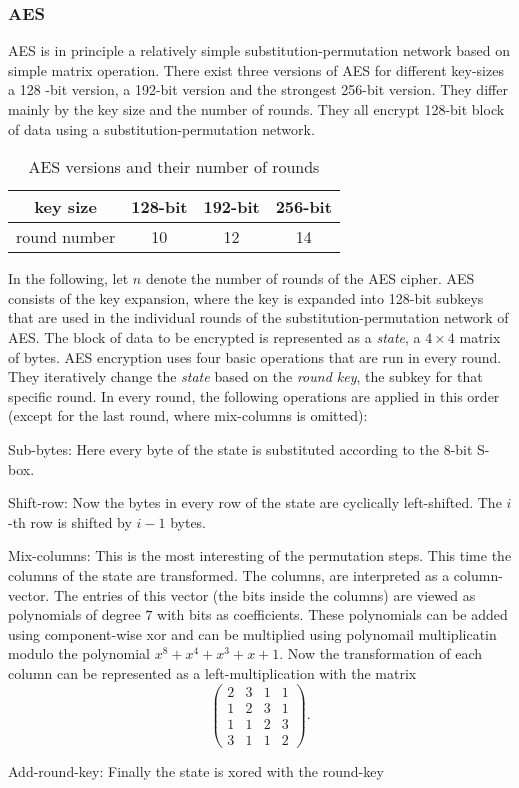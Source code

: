 \subsubsection{AES} %
AES is in principle a relatively simple substitution-permutation network based on simple matrix operation. There exist three versions of AES for different key-sizes a 128 -bit version, a 192-bit version and the strongest 256-bit version. They differ mainly by the key size and the number of rounds. They all encrypt 128-bit block of data using a substitution-permutation network.\par
\begin{table}[ht]\centering
  \begin{tabular}{|c|c|c|c|}
  	\hline key size & 128-bit & 192-bit & 256-bit \\ 
  	\hline round number & 10 & 12 & 14 \\ 
  	\hline 
  \end{tabular}
  \caption{AES versions and their number of rounds}
\end{table} 
In the following, let $n$ denote the number of rounds of the AES cipher. 
AES consists of the key expansion, where the key is expanded into 128-bit subkeys that are used in the individual rounds of the substitution-permutation network of AES. The block of data to be encrypted is represented as a \emph{state}, a $4\times 4$ matrix of bytes.  
AES encryption uses four basic operations that are run in every round. They iteratively change the \emph{state} based on the \emph{round key}, the subkey for that specific round. In every round, the following operations are applied in this order (except for the last round, where mix-columns is omitted):
\begin{compactenum}
  \item Sub-bytes: Here every byte of the state is substituted according to the 8-bit S-box. 
  \item Shift-row: Now the bytes in every row of the state are cyclically left-shifted. The $i$-th row is shifted by $i-1$ bytes. 
  \item Mix-columns: This is the most interesting of the permutation steps. This time the columns of the state are transformed. The columns, are interpreted as a column-vector. The entries of this vector (the bits inside the columns) are viewed as polynomials of degree $7$ with bits as coefficients. These polynomials can be added using component-wise xor and can be multiplied using polynomail multiplicatin modulo the polynomial $x^8+x^4+x^3+x+1$. Now the transformation of each column can be represented as a left-multiplication with the matrix $$\left(\begin{matrix}
    2&3&1&1\\1&2&3&1\\1&1&2&3\\3&1&1&2
  \end{matrix}\right).$$
  \item Add-round-key: Finally the state is xored with the round-key   
\end{compactenum}
